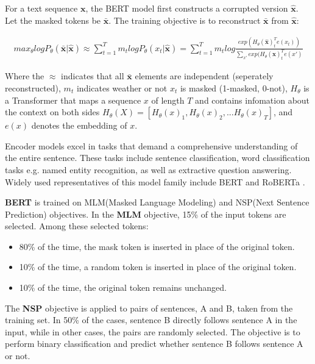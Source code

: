 For a text sequence $\textbf{x}$, the BERT model first constructs a corrupted version $\hat{\textbf{x}}$. Let the masked tokens be $\bar{\textbf{x}}$. The training objective is to reconstruct $\bar{\textbf{x}}$ from $\hat{\textbf{x}}$:

\begin{align}
max_{\theta}logP_{\theta}(\bar{\textbf{x}}|\hat{\textbf{x}})\approx \sum_{t=1}^Tm_tlogP_{\theta}(x_t|\hat{\textbf{x}})
=\sum_{t=1}^Tm_tlog\frac{exp(H_{\theta}(\hat{\textbf{x}})_t^Te(x_t))}{\sum_{x\prime} {exp(H_{\theta}(\hat{\textbf{x}})_t^Te(x\prime)}}
\end{align}

Where the $\approx$ indicates that all $\bar{\textbf{x}}$ elements are independent (seperately reconstructed), $m_t$ indicates weather or not $x_t$ is masked (1-masked, 0-not), $H_{\theta}$ is a Transformer that maps a sequence $x$ of length $T$ and contains infomation about the context on both sides $H_{\theta}(X)=[H_{\theta}(x)_1, H_{\theta}(x)_2,...H_{\theta}(x)_T]$, and $e(x)$ denotes the embedding of $x$.

Encoder models excel in tasks that demand a comprehensive understanding of the entire sentence. These tasks include sentence classification, word classification tasks e.g. named entity recognition, as well as extractive question answering. Widely used representatives of this model family include BERT \cite{devlin2018bert} and RoBERTa \cite{liu2019roberta}.

\textbf{BERT} \cite{devlin2018bert} is trained on MLM(Masked Language Modeling) and NSP(Next Sentence Prediction) objectives.
In the \textbf{MLM} objective, 15\% of the input tokens are selected. Among these selected tokens:
\begin{itemize}
    \item 80\% of the time, the mask token is inserted in place of the original token.
    \item 10\% of the time, a random token is inserted in place of the original token.
    \item 10\% of the time, the original token remains unchanged.
\end{itemize}
The \textbf{NSP} objective is applied to pairs of sentences, A and B, taken from the training set. In 50\% of the cases, sentence B directly follows sentence A in the input, while in other cases, the pairs are randomly selected. The objective is to perform binary classification and predict whether sentence B follows sentence A or not.

